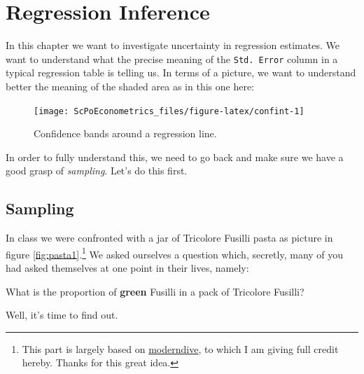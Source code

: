 \documentclass[]{book}
\newenvironment{tip}{\begin{tcolorbox}[colback=green!5!white,colframe=green]}{\end{tcolorbox}}
\begin{document}
\hypertarget{std-errors}{%
\chapter{Regression Inference}\label{std-errors}}

In this chapter we want to investigate uncertainty in regression estimates. We want to understand what the precise meaning of the \texttt{Std.\ Error} column in a typical regression table is telling us. In terms of a picture, we want to understand better the meaning of the shaded area as in this one here:

\begin{figure}

{\centering \texttt{[image: ScPoEconometrics\_files/figure-latex/confint-1]} 

}

\caption{Confidence bands around a regression line.}\label{fig:confint}
\end{figure}

In order to fully understand this, we need to go back and make sure we have a good grasp of \emph{sampling}. Let's do this first.

\hypertarget{sampling}{%
\section{Sampling}\label{sampling}}

In class we were confronted with a jar of Tricolore Fusilli pasta as picture in figure \ref{fig:pasta1}.\footnote{This part is largely based on \href{https://moderndive.com/7-sampling.html}{moderndive}, to which I am giving full credit hereby. Thanks for this great idea.} We asked ourselves a question which, secretly, many of you had asked themselves at one point in their lives, namely:

\begin{tip}
What is the proportion of \textbf{green} Fusilli in a pack of Tricolore
Fusilli?
\end{tip}

Well, it's time to find out.
\end{document}
